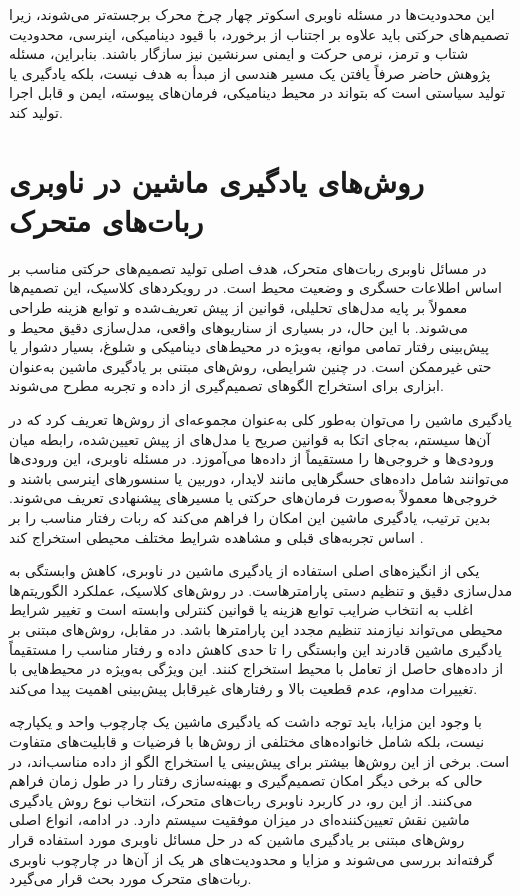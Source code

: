 این محدودیت‌ها در مسئله ناوبری اسکوتر چهار چرخ محرک برجسته‌تر می‌شوند، زیرا تصمیم‌های حرکتی باید علاوه بر اجتناب از برخورد، با قیود دینامیکی، اینرسی، محدودیت شتاب و ترمز، نرمی حرکت و ایمنی سرنشین نیز سازگار باشند. بنابراین، مسئله پژوهش حاضر صرفاً یافتن یک مسیر هندسی از مبدأ به هدف نیست، بلکه یادگیری یا تولید سیاستی است که بتواند در محیط دینامیکی، فرمان‌های پیوسته، ایمن و قابل اجرا تولید کند.

\section{روش‌های یادگیری ماشین در ناوبری ربات‌های متحرک}

در مسائل ناوبری ربات‌های متحرک، هدف اصلی تولید تصمیم‌های حرکتی مناسب بر اساس اطلاعات حسگری و وضعیت محیط است. در رویکردهای کلاسیک، این تصمیم‌ها معمولاً بر پایه مدل‌های تحلیلی، قوانین از پیش تعریف‌شده و توابع هزینه طراحی می‌شوند. با این حال، در بسیاری از سناریوهای واقعی، مدل‌سازی دقیق محیط و پیش‌بینی رفتار تمامی موانع، به‌ویژه در محیط‌های دینامیکی و شلوغ، بسیار دشوار یا حتی غیرممکن است. در چنین شرایطی، روش‌های مبتنی بر یادگیری ماشین به‌عنوان ابزاری برای استخراج الگوهای تصمیم‌گیری از داده و تجربه مطرح می‌شوند.

یادگیری ماشین را می‌توان به‌طور کلی به‌عنوان مجموعه‌ای از روش‌ها تعریف کرد که در آن‌ها سیستم، به‌جای اتکا به قوانین صریح یا مدل‌های از پیش تعیین‌شده، رابطه میان ورودی‌ها و خروجی‌ها را مستقیماً از داده‌ها می‌آموزد. در مسئله ناوبری، این ورودی‌ها می‌توانند شامل داده‌های حسگرهایی مانند لایدار، دوربین یا سنسورهای اینرسی باشند و خروجی‌ها معمولاً به‌صورت فرمان‌های حرکتی یا مسیرهای پیشنهادی تعریف می‌شوند. بدین ترتیب، یادگیری ماشین این امکان را فراهم می‌کند که ربات رفتار مناسب را بر اساس تجربه‌های قبلی و مشاهده شرایط مختلف محیطی استخراج کند%
\cite{Zhu2021}. %

یکی از انگیزه‌های اصلی استفاده از یادگیری ماشین در ناوبری، کاهش وابستگی به مدل‌سازی دقیق و تنظیم دستی پارامترهاست. در روش‌های کلاسیک، عملکرد الگوریتم‌ها اغلب به انتخاب ضرایب توابع هزینه یا قوانین کنترلی وابسته است و تغییر شرایط محیطی می‌تواند نیازمند تنظیم مجدد این پارامترها باشد. در مقابل، روش‌های مبتنی بر یادگیری ماشین قادرند این وابستگی را تا حدی کاهش داده و رفتار مناسب را مستقیماً از داده‌های حاصل از تعامل با محیط استخراج کنند. این ویژگی به‌ویژه در محیط‌هایی با تغییرات مداوم، عدم قطعیت بالا و رفتارهای غیرقابل پیش‌بینی اهمیت پیدا می‌کند.

با وجود این مزایا، باید توجه داشت که یادگیری ماشین یک چارچوب واحد و یکپارچه نیست، بلکه شامل خانواده‌های مختلفی از روش‌ها با فرضیات و قابلیت‌های متفاوت است. برخی از این روش‌ها بیشتر برای پیش‌بینی یا استخراج الگو از داده مناسب‌اند، در حالی که برخی دیگر امکان تصمیم‌گیری و بهینه‌سازی رفتار را در طول زمان فراهم می‌کنند. از این رو، در کاربرد ناوبری ربات‌های متحرک، انتخاب نوع روش یادگیری ماشین نقش تعیین‌کننده‌ای در میزان موفقیت سیستم دارد. در ادامه، انواع اصلی روش‌های مبتنی بر یادگیری ماشین که در حل مسائل ناوبری مورد استفاده قرار گرفته‌اند بررسی می‌شوند و مزایا و محدودیت‌های هر یک از آن‌ها در چارچوب ناوبری ربات‌های متحرک مورد بحث قرار می‌گیرد.

